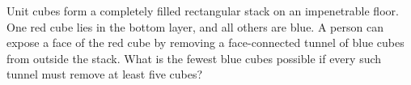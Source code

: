 Unit cubes form a completely filled rectangular stack on an impenetrable floor. One red cube lies in the bottom layer, and all others are blue. A person can expose a face of the red cube by removing a face-connected tunnel of blue cubes from outside the stack. What is the fewest blue cubes possible if every such tunnel must remove at least five cubes?
